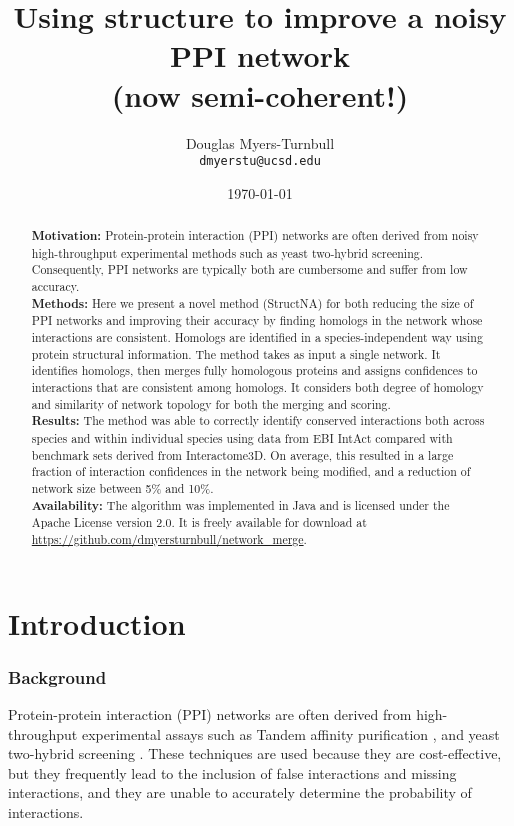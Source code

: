 \documentclass[12pt,twoside]{article}
\begin{document}
\title{\textbf{Using structure to improve a noisy PPI network} \\ \Large{(now semi-coherent!)}}
\author{Douglas Myers-Turnbull\\ \texttt{dmyerstu@ucsd.edu}}
\date{\small{\today}}
\maketitle

\begin{abstract}
\noindent\textbf{Motivation: } Protein-protein interaction (PPI) networks are often derived from noisy high-throughput experimental methods such as yeast two-hybrid screening. Consequently, PPI networks are typically both are cumbersome and suffer from low accuracy.\\
\textbf{Methods: } Here we present a novel method (StructNA) for both reducing the size of PPI networks and improving their accuracy by finding homologs in the network whose interactions are consistent. Homologs are identified in a species-independent way using protein structural information. The method takes as input a single network. It identifies homologs, then merges fully homologous proteins and assigns confidences to  interactions that are consistent among homologs. It considers both degree of homology and similarity of network topology for both the merging and scoring.\\
\textbf{Results: } The method was able to correctly identify conserved interactions both across species and within individual species using data from EBI IntAct compared with benchmark sets derived from Interactome3D. On average, this resulted in a large fraction of interaction confidences in the network being modified, and a reduction of network size between 5\% and 10\%. \\
\textbf{Availability: } The algorithm was implemented in Java and is licensed under the Apache License version 2.0. It is freely available for download at \url{https://github.com/dmyersturnbull/network_merge}.
\end{abstract}

\section{Introduction}

\subsubsection{Background}
Protein-protein interaction (PPI) networks are often derived from high-throughput experimental assays such as Tandem affinity purification \cite{rigaut}, and yeast two-hybrid screening \cite{fields}. These techniques are used because they are cost-effective, but they frequently lead to the inclusion of false interactions and missing interactions, and they are unable to accurately determine the probability of interactions.
\end{document}
